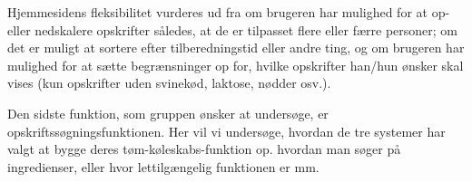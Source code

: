 Hjemmesidens fleksibilitet vurderes ud fra om brugeren har mulighed for \fx at op- eller nedskalere opskrifter således, at de er tilpasset flere eller færre personer; om det er muligt at sortere efter tilberedningstid eller andre ting, og om brugeren har mulighed for at sætte begrænsninger op for, hvilke opskrifter han/hun ønsker skal vises (\fx kun opskrifter uden svinekød, laktose, nødder osv.). 

Den sidste funktion, som gruppen ønsker at undersøge, er opskriftssøgningsfunktionen. Her vil vi undersøge, hvordan de tre systemer har valgt at bygge deres tøm-køleskabs-funktion op. \Fx hvordan man søger på ingredienser, eller hvor lettilgængelig funktionen er mm.






